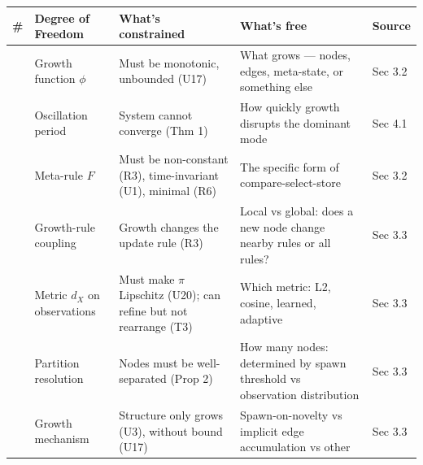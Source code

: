 \documentclass[
  11pt,
]{article}
\newcounter{none} %
\begin{document}
{\def\LTcaptype{none} %
\begin{longtable}[]{@{}
  >{\raggedright\arraybackslash}p{}
  >{\raggedright\arraybackslash}p{}
  >{\raggedright\arraybackslash}p{}
  >{\raggedright\arraybackslash}p{}
  >{\raggedright\arraybackslash}p{}@{}}
\toprule\noalign{}
\begin{minipage}[b]{\linewidth}\raggedright
\#
\end{minipage} & \begin{minipage}[b]{\linewidth}\raggedright
Degree of Freedom
\end{minipage} & \begin{minipage}[b]{\linewidth}\raggedright
What's constrained
\end{minipage} & \begin{minipage}[b]{\linewidth}\raggedright
What's free
\end{minipage} & \begin{minipage}[b]{\linewidth}\raggedright
Source
\end{minipage} \\
\midrule\noalign{}
\endhead
\bottomrule\noalign{}
\endlastfoot
1 & Growth function \(\phi\) & Must be monotonic, unbounded (U17) & What
grows --- nodes, edges, meta-state, or something else & Sec 3.2 \\
2 & Oscillation period & System cannot converge (Thm 1) & How quickly
growth disrupts the dominant mode & Sec 4.1 \\
3 & Meta-rule \(F\) & Must be non-constant (R3), time-invariant (U1),
minimal (R6) & The specific form of compare-select-store & Sec 3.2 \\
4 & Growth-rule coupling & Growth changes the update rule (R3) & Local
vs global: does a new node change nearby rules or all rules? & Sec
3.3 \\
5 & Metric \(d_X\) on observations & Must make \(\pi\) Lipschitz (U20);
can refine but not rearrange (T3) & Which metric: L2, cosine, learned,
adaptive & Sec 3.3 \\
6 & Partition resolution & Nodes must be well-separated (Prop 2) & How
many nodes: determined by spawn threshold vs observation distribution &
Sec 3.3 \\
7 & Growth mechanism & Structure only grows (U3), without bound (U17) &
Spawn-on-novelty vs implicit edge accumulation vs other & Sec 3.3 \\

\end{longtable}}
\end{document}

